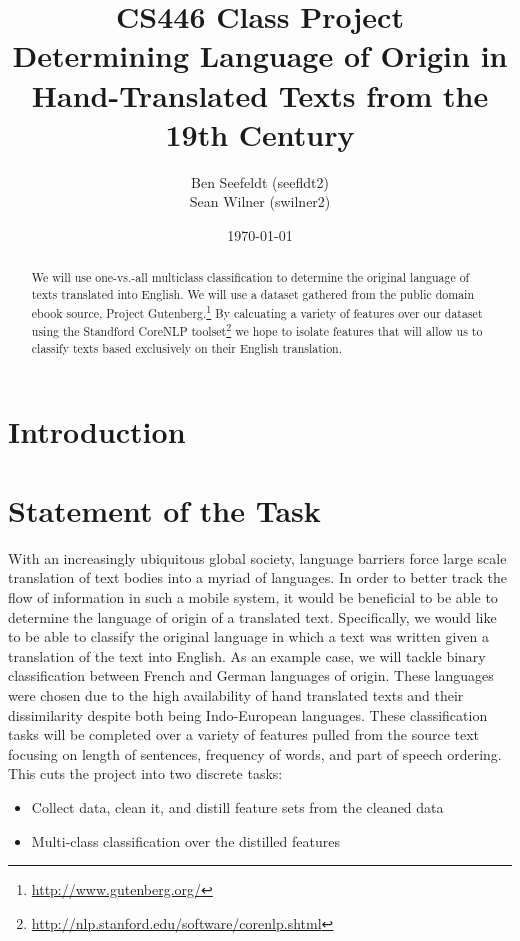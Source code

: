 \documentclass[11pt,letterpaper]{article}
\title { CS446 Class Project\\ \large Determining Language of Origin in
Hand-Translated Texts from the 19th Century }
\author{ Ben Seefeldt (seefldt2)
         \\ Sean Wilner (swilner2) \\ }
\date{\today}
\newcommand{\blue}[1]{\textcolor{RoyalBlue}{#1}}
\newcommand{\instructions}[1]{\blue{\textit{#1}}}
\begin{document}
 \maketitle

\begin{abstract}
We will use one-vs.-all multiclass classification to determine the original
language of texts translated into English. We will use a dataset gathered from
the public domain ebook source, Project
Gutenberg.\footnote{\url{http://www.gutenberg.org/}} By calcuating a variety of
features over our dataset using the Standford CoreNLP
toolset\footnote{\url{http://nlp.stanford.edu/software/corenlp.shtml}} we hope
to isolate features that will allow us to classify texts based exclusively on
their English translation.
\end{abstract}

\section{Introduction} 
\label{sec:introduction}
\section{Statement of the Task} With an increasingly ubiquitous global society,
language barriers force large scale translation of text bodies into a myriad of
languages.  In order to better track the flow of information in such a mobile
system, it would be beneficial to be able to determine the language of origin
of a translated text.  Specifically, we would like to be able to classify the
original language in which a text was written given a translation of the text
into English.   As an example case, we will tackle binary classification
between French and German languages of origin.  These languages were chosen due
to the high availability of hand translated texts and their dissimilarity
despite both being Indo-European languages.  These classiﬁcation tasks will be
completed over a variety of features pulled from the source text focusing on
length of sentences, frequency of words, and part of speech ordering.\\

This cuts the project into two discrete tasks: 
\begin{itemize} 
  \item Collect data, clean it, and distill feature sets from the cleaned data
  \item Multi-class classiﬁcation over the distilled features 
\end{itemize}
\end{document}
